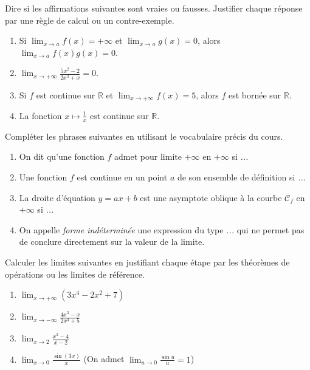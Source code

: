 \documentclass[11pt]{article}
\begin{document}
\begin{exercice}
Dire si les affirmations suivantes sont vraies ou fausses. Justifier chaque réponse par une règle de calcul ou un contre-exemple.
\begin{enumerate}
\item Si $\lim_{x\to a} f(x) = +\infty$ et $\lim_{x\to a} g(x) = 0$, alors $\lim_{x\to a} f(x)g(x) = 0$.
\item $\displaystyle\lim_{x\to +\infty} \frac{5x^2 - 2}{2x^3 + x} = 0$.
\item Si $f$ est continue sur $\mathbb{R}$ et $\lim_{x\to +\infty} f(x) = 5$, alors $f$ est bornée sur $\mathbb{R}$.
\item La fonction $x \mapsto \frac{1}{x}$ est continue sur $\mathbb{R}$.
\end{enumerate}
\end{exercice}

\begin{exercice}
Compléter les phrases suivantes en utilisant le vocabulaire précis du cours.
\begin{enumerate}
\item On dit qu'une fonction $f$ admet pour limite $+\infty$ en $+\infty$ si \emph{...}
\item Une fonction $f$ est continue en un point $a$ de son ensemble de définition si \emph{...}
\item La droite d'équation $y = ax + b$ est une asymptote oblique à la courbe $\mathcal{C}_f$ en $+\infty$ si \emph{...}
\item On appelle \emph{forme indéterminée} une expression du type \emph{...} qui ne permet pas de conclure directement sur la valeur de la limite.
\end{enumerate}
\end{exercice}

\begin{exercice}
Calculer les limites suivantes en justifiant chaque étape par les théorèmes de opérations ou les limites de référence.
\begin{enumerate}
\item $\displaystyle\lim_{x\to +\infty} (3x^4 - 2x^2 + 7)$
\item $\displaystyle\lim_{x\to -\infty} \frac{4x^3 - x}{2x^3 + 5}$
\item $\displaystyle\lim_{x\to 2} \frac{x^2 - 4}{x - 2}$
\item $\displaystyle\lim_{x\to 0} \frac{\sin(3x)}{x}$ \quad (On admet $\lim_{u\to 0} \frac{\sin u}{u} = 1$)
\end{enumerate}
\end{exercice}
\end{document}
